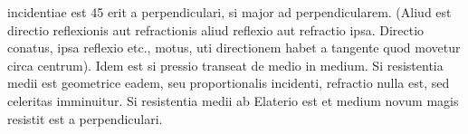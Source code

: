 incidentiae\protect{} est  45  erit a perpendiculari, si major ad perpendicularem. (Aliud est directio reflexionis\protect{} aut refractionis\protect{} aliud reflexio\protect{} aut refractio\protect{} ipsa. Directio conatus, ipsa reflexio\protect{} etc., motus, uti directionem habet a tangente quod movetur circa centrum). Idem est si pressio transeat de medio in medium. Si resistentia \hspace{1mm}medii est \hspace{1mm}geometrice eadem, seu \hspace{1mm}proportionalis incidenti, refractio\protect{} nulla est, sed celeritas\protect{} imminuitur. Si resistentia medii ab Elaterio\protect{} est et medium novum magis resistit  est a perpendiculari.\pend 